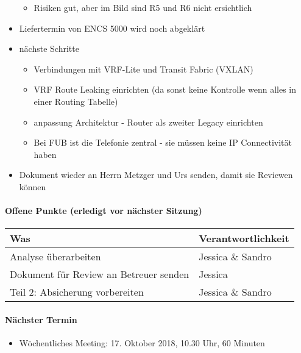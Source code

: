 \begin{itemize}
	\begin{itemize}
		\item Risiken gut, aber im Bild sind R5 und R6 nicht ersichtlich
	\end{itemize}
	\item Liefertermin von ENCS 5000 wird noch abgeklärt
	\item nächste Schritte
	\begin{itemize}
		\item Verbindungen mit VRF-Lite und Transit Fabric (VXLAN)
		\item VRF Route Leaking einrichten (da sonst keine Kontrolle wenn alles in einer Routing Tabelle)
		\item anpassung Architektur - Router als zweiter Legacy einrichten
		\item Bei FUB ist die Telefonie zentral - sie müssen keine IP Connectivität haben
	\end{itemize}
	\item Dokument wieder an Herrn Metzger und Urs senden, damit sie Reviewen können
\end{itemize}


\paragraph{Offene Punkte (erledigt vor nächster Sitzung)} \mbox{}
\begin{table}[H]
	\centering
	\begin{tabularx}{\textwidth}{X | p{4.5cm}}
		\rowcolor{gray!50}
		\textbf{Was} & \textbf{Verantwortlichkeit} \\
		\hline	
		Analyse überarbeiten & Jessica \& Sandro  \\
		Dokument für Review an Betreuer senden & Jessica \\
		Teil 2: Absicherung vorbereiten & Jessica \& Sandro \\
	\end{tabularx}
	\label{tab:my-label}
\end{table}

\paragraph{Nächster Termin}
\begin{itemize}	
	\item Wöchentliches Meeting: 17. Oktober 2018, 10.30 Uhr, 60 Minuten
\end{itemize}


